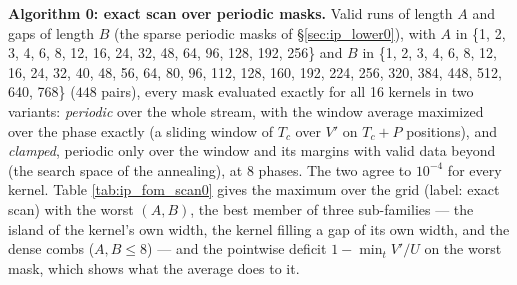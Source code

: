 \documentclass{article}
\numberwithin{equation}{section}   %
\begin{document}
{\bf Algorithm 0: exact scan over periodic masks.}  Valid runs of length $A$ and gaps of length $B$
(the sparse periodic masks of \S\ref{sec:ip_lower0}), with $A$ in \{1, 2, 3, 4, 6, 8, 12, 16, 24,
32, 48, 64, 96, 128, 192, 256\} and $B$ in \{1, 2, 3, 4, 6, 8, 12, 16, 24, 32, 40, 48, 56, 64, 80, 96, 112,
128, 160, 192, 224, 256, 320, 384, 448, 512, 640, 768\} ($448$ pairs), every mask evaluated exactly for all 16 kernels in two variants:
{\em periodic} over the whole stream, with the window average maximized over the phase exactly (a
sliding window of $T_c$ over $V'$ on $T_c + P$ positions), and {\em clamped}, periodic only over the
window and its margins with valid data beyond (the search space of the annealing), at 8 phases.  The
two agree to $10^{-4}$ for every kernel.  Table \ref{tab:ip_fom_scan0} gives the maximum over the grid
(label: exact scan) with the worst $(A, B)$, the best member of three sub-families --- the island of the
kernel's own width, the kernel filling a gap of its own width, and the dense combs ($A, B \le 8$) --- and
the pointwise deficit $1 - \min_t V'/U$ on the worst mask, which shows what the average does to it.
\end{document}
